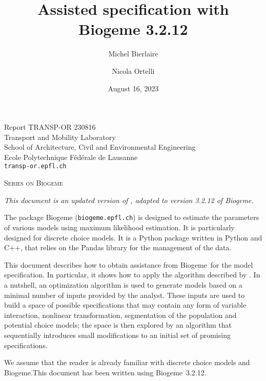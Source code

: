 \documentclass[12pt,a4paper]{article}
\title{Assisted specification with Biogeme 3.2.12}
\author{Michel Bierlaire \and Nicola Ortelli}
\date{August 16, 2023}
\newcommand{\PDBIOGEME}{Biogeme}
\begin{document}
\begin{titlepage}
  \pagestyle{empty}

  \maketitle
  \vspace{2cm}

  \begin{center}
    \small Report TRANSP-OR 230816 \\ Transport and Mobility Laboratory \\ School of Architecture, Civil and Environmental Engineering \\ Ecole Polytechnique F\'ed\'erale de Lausanne \\ \verb+transp-or.epfl.ch+
    \begin{center}
      \textsc{Series on Biogeme}
    \end{center}
  \end{center}
    \begin{center}
\emph{This document is an updated version of , adapted to version 3.2.12 of \PDBIOGEME.}
    \end{center}


  \clearpage
\end{titlepage}



The package Biogeme (\texttt{biogeme.epfl.ch}) is designed to estimate
the parameters of various models using maximum likelihood
estimation. It is particularly designed for discrete choice
models. It is a Python package written in Python and C++, that relies on the
Pandas library for the management of the data. 

This document describes how to obtain assistance from \PDBIOGEME\ for the model specification. In particular, it shows how to apply the
algorithm  described by
. In a nutshell, an optimization
algorithm is used to generate models based on a minimal
number of inputs provided by the analyst. These inputs are used to
build a space of possible specifications that may contain any form of
variable interaction, nonlinear transformation, segmentation of the
population and potential choice models; the space is
then explored by an algorithm that sequentially introduces small
modifications to an initial set of promising specifications.

We assume that the reader is already familiar with discrete choice
models and \PDBIOGEME.\@   This document has
been written using \PDBIOGEME\ 3.2.12.
\end{document}
